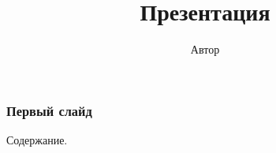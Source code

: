 \documentclass{beamer}
\title{Презентация}
\author{Автор}
\begin{document}
\frame{\titlepage}
\begin{frame}
\frametitle{Первый слайд}
Содержание.
\end{frame}
\end{document}
